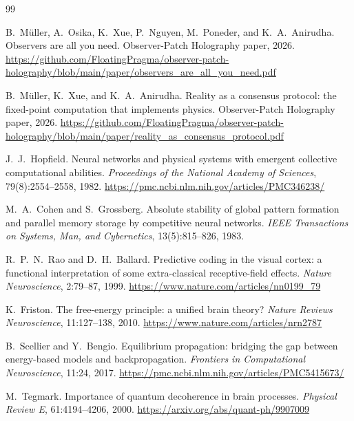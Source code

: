 \documentclass[11pt]{article}
\theoremstyle{remark}
\theoremstyle{plain}
\begin{document}
\begin{thebibliography}{99}

B.\ M\"uller, A.\ Osika, K.\ Xue, P.\ Nguyen, M.\ Poneder, and K.\ A.\ Anirudha.
\newblock Observers are all you need.
\newblock Observer-Patch Holography paper, 2026.
\newblock \url{https://github.com/FloatingPragma/observer-patch-holography/blob/main/paper/observers_are_all_you_need.pdf}

B.\ M\"uller, K.\ Xue, and K.\ A.\ Anirudha.
\newblock Reality as a consensus protocol: the fixed-point computation that implements physics.
\newblock Observer-Patch Holography paper, 2026.
\newblock \url{https://github.com/FloatingPragma/observer-patch-holography/blob/main/paper/reality_as_consensus_protocol.pdf}

J.\ J.\ Hopfield.
\newblock Neural networks and physical systems with emergent collective computational abilities.
\newblock \emph{Proceedings of the National Academy of Sciences}, 79(8):2554--2558, 1982.
\newblock \url{https://pmc.ncbi.nlm.nih.gov/articles/PMC346238/}

M.\ A.\ Cohen and S.\ Grossberg.
\newblock Absolute stability of global pattern formation and parallel memory storage by competitive neural networks.
\newblock \emph{IEEE Transactions on Systems, Man, and Cybernetics}, 13(5):815--826, 1983.

R.\ P.\ N.\ Rao and D.\ H.\ Ballard.
\newblock Predictive coding in the visual cortex: a functional interpretation of some extra-classical receptive-field effects.
\newblock \emph{Nature Neuroscience}, 2:79--87, 1999.
\newblock \url{https://www.nature.com/articles/nn0199_79}

K.\ Friston.
\newblock The free-energy principle: a unified brain theory?
\newblock \emph{Nature Reviews Neuroscience}, 11:127--138, 2010.
\newblock \url{https://www.nature.com/articles/nrn2787}

B.\ Scellier and Y.\ Bengio.
\newblock Equilibrium propagation: bridging the gap between energy-based models and backpropagation.
\newblock \emph{Frontiers in Computational Neuroscience}, 11:24, 2017.
\newblock \url{https://pmc.ncbi.nlm.nih.gov/articles/PMC5415673/}

M.\ Tegmark.
\newblock Importance of quantum decoherence in brain processes.
\newblock \emph{Physical Review E}, 61:4194--4206, 2000.
\newblock \url{https://arxiv.org/abs/quant-ph/9907009}


\end{thebibliography}
\end{document}

